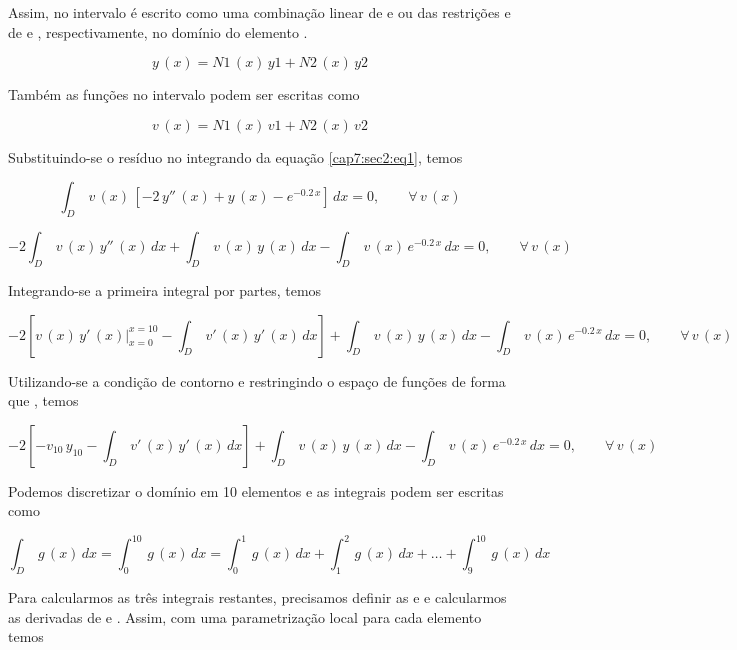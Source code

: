 \begin{example}
\begin{enumerate}
Assim,  no intervalo \esp{[1,\,2]} é escrito como uma combinação linear de  e  ou das restrições  e  de  e , respectivamente, no domínio do elemento .

\[
 y\,(x) = N1\,(x) \, y1 + N2\,(x) \, y2
\]

Também as funções  no intervalo podem ser escritas como

\[
 v\,(x) = N1\,(x)\,v1 + N2\,(x)\,v2
\]

Substituindo-se o resíduo  no integrando da equação \ref{cap7:sec2:eq1}, temos

\[
 \int_D \, v\,(x) \, [-2\,y''\,(x) + y\,(x) - e^{-0.2\,x}] \, dx = 0, \qquad \forall \, v\,(x)
\]

\[
 -2 \int_D \, v\,(x) \, y''\,(x) \, dx + \int_D \, v\,(x) \, y\,(x) \, dx - \int_D \, v\,(x) \, e^{-0.2\,x} \, dx = 0, \qquad \forall \, v\,(x)
\]

Integrando-se a primeira integral por partes, temos

\[
 -2 \left[ \left. v\,(x) \, y'\,(x) \right|^{x=10}_{x=0} - \int_D \, v'\,(x) \, y'\,(x) \, dx \right] + \int_D \, v\,(x) \, y\,(x) \, dx - \int_D \, v\,(x) \, e^{-0.2\,x} \, dx = 0, \qquad \forall \, v\,(x)
\]

Utilizando-se a condição de contorno  e restringindo o espaço de funções  de forma que , temos

\[
 -2 \left[ -v_{10} \, y_{10} - \int_D \, v'\,(x) \, y'\,(x) \, dx \right] + \int_D \, v\,(x) \, y\,(x) \, dx - \int_D \, v\,(x) \, e^{-0.2\,x} \, dx = 0, \qquad \forall \, v\,(x)
\]

Podemos discretizar o domínio  em 10 elementos e as integrais podem ser escritas como

\[
 \int_D \, g\,(x) \, dx = \int_0^{10} \, g\,(x) \, dx = \int_0^1 \, g\,(x) \, dx + \int_1^2 \, g\,(x) \, dx + \ldots + \int_9^{10} \, g\,(x) \, dx
\]

Para calcularmos as três integrais restantes, precisamos definir as  e  e calcularmos as derivadas de  e . Assim, com uma parametrização local para cada elemento temos


\end{enumerate}
\end{example}
